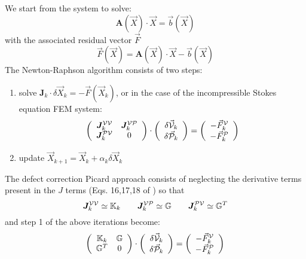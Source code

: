 We start from the system to solve:
\[
{\bm A}(\vec X) \cdot \vec X = \vec b(\vec X)
\]
with the associated residual vector $\vec F$ 
\[
\vec F(\vec X) = {\bm A}(\vec X) \cdot \vec X - \vec b(\vec X)
\]
The Newton-Raphson algorithm consists of two steps:
\begin{enumerate}
\item solve $\bm J_k \cdot \delta \vec X_k = -\vec F(\vec X_k)$, or in the 
case of the incompressible Stokes equation FEM system:
\[
\left(
\begin{array}{cc}
\bm J^{{\cal V}{\cal V}}_k & \bm J^{{\cal V}{\cal P}}_k \\
\bm J^{{\cal P}{\cal V}}_k & 0
\end{array}
\right)
\cdot
\left(
\begin{array}{c}
\delta \vec {\cal V}_k \\ \delta \vec {\cal P}_k
\end{array}
\right)
=
\left(
\begin{array}{c}
- \vec F_k^{\cal V} \\ -\vec F_k^{\cal P}
\end{array}
\right)
\]

\item update $\vec X_{k+1} = \vec X_k + \alpha_k \delta \vec X_k$
\end{enumerate}
The defect correction Picard approach consists of neglecting the derivative terms present 
in the $J$ terms (Eqs. 16,17,18 of \cite{frbt19}) so that 
\[
\bm J^{{\cal V}{\cal V}}_k \simeq {\mathbb{K}}_k 
\quad\quad
\bm J^{{\cal V}{\cal P}}_k \simeq {\mathbb{G}} 
\quad\quad
\bm J^{{\cal P}{\cal V}}_k \simeq {\mathbb{G}}^T
\]
and step 1 of the above iterations become:
\[
\left(
\begin{array}{cc}
{\mathbb{K}}_k & {\mathbb{G}} \\ {\mathbb{G}}^T & 0
\end{array}
\right)
\cdot
\left(
\begin{array}{c}
\delta \vec {\cal V}_k \\ \delta \vec {\cal P}_k
\end{array}
\right)
=
\left(
\begin{array}{c}
- \vec F_k^{\cal V} \\ -\vec F_k^{\cal P}
\end{array}
\right)
\]



